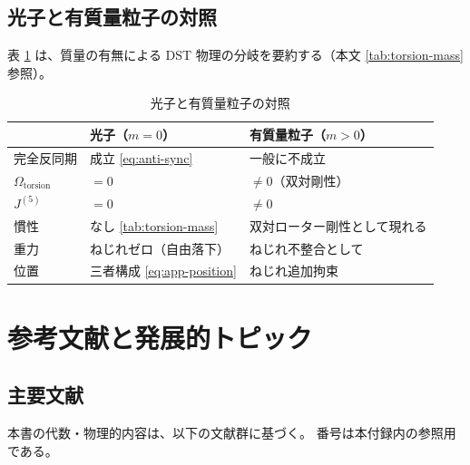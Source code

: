 \documentclass[dvipdfmx,a4paper,oneside]{jsbook}
\numberwithin{equation}{chapter}
\begin{document}
\section{光子と有質量粒子の対照}

表 \ref{tab:app-mass-comparison} は、質量の有無による DST 物理の分岐を要約する（本文 \ref{tab:torsion-mass} 参照）。

\begin{table}[htbp]
  \centering
  \caption{光子と有質量粒子の対照}
  \label{tab:app-mass-comparison}
  \begin{tabular}{@{}lll@{}}
    \toprule
    & 光子（\(m=0\)） & 有質量粒子（\(m>0\)） \\
    \midrule
    完全反同期 & 成立 \eqref{eq:anti-sync} & 一般に不成立 \\
    \(\Omega_{\mathrm{torsion}}\) & \(= 0\) & \(\neq 0\)（双対剛性） \\
    \(J^{(5)}\) & \(= 0\) & \(\neq 0\) \\
    慣性 & なし \eqref{tab:torsion-mass} & 双対ローター剛性として現れる \\
    重力 & ねじれゼロ（自由落下） & ねじれ不整合として \\
    位置 & 三者構成 \eqref{eq:app-position} & ねじれ追加拘束 \\
    \bottomrule
  \end{tabular}
\end{table}

\chapter{参考文献と発展的トピック}

\section{主要文献}

本書の代数・物理的内容は、以下の文献群に基づく。
番号は本付録内の参照用である。
\end{document}
